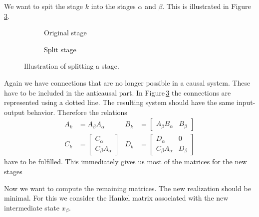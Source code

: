 \documentclass[doctype=mastersthesis,BCOR=15mm,biblatex]{ldvbook}%
\begin{document}
We want to spit the stage $k$ into the stages $\alpha$ and $\beta$.
This is illustrated in Figure\,\ref{fig:split_up}.
\begin{figure}[!htb]
	\centering
	
	\begin{subfigure}[b]{0.45\textwidth}
		\caption{Original stage}
		\label{fig:move_split_a}
	\end{subfigure}
	\hspace{0.8cm}
	\begin{subfigure}[b]{0.45\textwidth}
		\caption{Split stage}
		\label{fig:move_split_b}
	\end{subfigure}
	\caption{Illustration of splitting a stage.}
	\label{fig:split_up}
\end{figure}
Again we have connections that are no longer possible in a causal system. 
These have to be included in the anticausal part. In Figure\,\ref{fig:split_up} the connections are represented using a dotted line.
The resulting system should have the same input-output behavior. Therefore the relations
\begin{subequations}
\begin{align}
	A_k&=A_\beta A_\alpha & B_k&=\begin{bmatrix}A_\beta B_\alpha &
	B_\beta \end{bmatrix}\\
	C_k&=\begin{bmatrix}C_\alpha \\ C_\beta A_\alpha \end{bmatrix}&
	D_k&= \begin{bmatrix} D_\alpha & 0 \\ C_\beta A_\alpha & D_\beta \end{bmatrix}
\end{align}\label{eq:relations}
\end{subequations}
have to be fulfilled.
This immediately gives us most of the matrices for the new stages

Now we want to compute the remaining matrices.
The new realization should be minimal.
For this we consider the Hankel matrix associated with the new intermediate state $x_\beta$.
\end{document}

